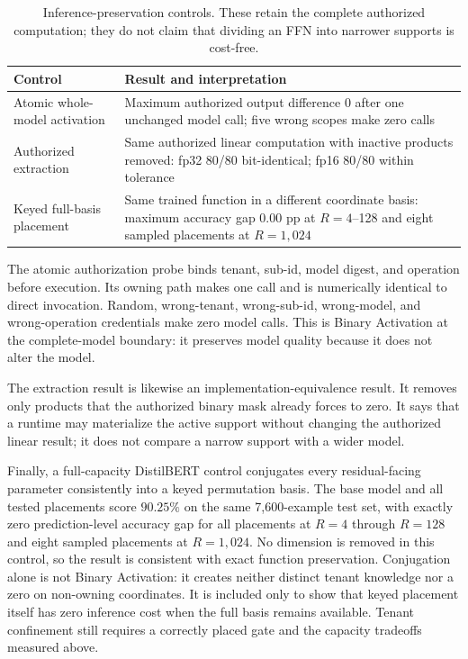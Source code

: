 \documentclass[11pt]{article}
\begin{document}
\begin{table}[ht]
\centering
\caption{Inference-preservation controls. These retain the complete authorized
computation; they do not claim that dividing an FFN into narrower supports is
cost-free.}
\label{tab:zero-cost-controls}
\small
\begin{tabularx}{\textwidth}{@{}p{}X@{}}
\toprule
Control & Result and interpretation \\
\midrule
Atomic whole-model activation & Maximum authorized output difference 0 after one
unchanged model call; five wrong scopes make zero calls \\
Authorized extraction & Same authorized linear computation with inactive products
removed: fp32 80/80 bit-identical; fp16 80/80 within tolerance \\
Keyed full-basis placement & Same trained function in a different coordinate basis:
maximum accuracy gap 0.00 pp at $R=4$--128 and eight sampled placements at
$R=1{,}024$ \\
\bottomrule
\end{tabularx}
\end{table}

The atomic authorization probe binds tenant, sub-id, model digest, and operation
before execution. Its owning path makes one call and is numerically identical to
direct invocation. Random, wrong-tenant, wrong-sub-id, wrong-model, and
wrong-operation credentials make zero model calls. This is Binary Activation at
the complete-model boundary: it preserves model quality because it does not
alter the model.

The extraction result is likewise an implementation-equivalence result. It
removes only products that the authorized binary mask already forces to zero.
It says that a runtime may materialize the active support without changing the
authorized linear result; it does not compare a narrow support with a wider
model.

Finally, a full-capacity DistilBERT control conjugates every residual-facing
parameter consistently into a keyed permutation basis. The base model and all
tested placements score $90.25\%$ on the same 7,600-example test set, with
exactly zero prediction-level accuracy gap for all placements at $R=4$ through
$R=128$ and eight sampled placements at $R=1{,}024$. No dimension is removed in
this control, so the result is consistent with exact function preservation.
Conjugation alone is not Binary Activation: it creates neither distinct tenant
knowledge nor a zero on non-owning coordinates. It is included only to show
that keyed placement itself has zero inference cost when the full basis remains
available. Tenant confinement still requires a correctly placed gate and the
capacity tradeoffs measured above.
\end{document}
